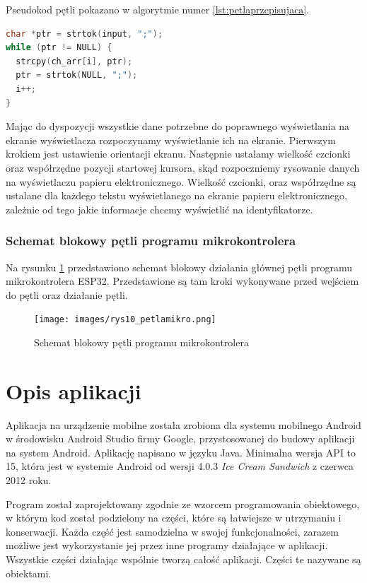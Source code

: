 \documentclass[a4paper,12pt, twoside]{article}
\begin{document}
	Pseudokod pętli pokazano w algorytmie numer \ref{lst:petlaprzepisujaca}.

\begin{lstlisting}[language=C++, label={lst:petlaprzepisujaca}, caption=Działanie pętli przepisującej otrzymane dane do tablicy]
char *ptr = strtok(input, ";");
while (ptr != NULL) {
  strcpy(ch_arr[i], ptr);
  ptr = strtok(NULL, ";");
  i++;
}\end{lstlisting}	
	\vspace{.5cm}
	Mając do dyspozycji wszystkie dane potrzebne do poprawnego wyświetlania na ekranie wyświetlacza rozpoczynamy wyświetlanie ich na ekranie. Pierwszym krokiem jest ustawienie orientacji ekranu. Następnie ustalamy wielkość czcionki oraz współrzędne pozycji startowej kursora, skąd rozpoczniemy rysowanie danych na wyświetlaczu papieru elektronicznego. Wielkość czcionki, oraz współrzędne są ustalane dla każdego tekstu wyświetlanego na ekranie papieru elektronicznego, zależnie od tego jakie informacje chcemy wyświetlić na identyfikatorze.
\vspace{1cm}
	\subsubsection{Schemat blokowy pętli programu mikrokontrolera}
	Na rysunku \ref{fig:petlamikrokontrolera} przedstawiono schemat blokowy działania głównej pętli programu mikrokontrolera ESP32. Przedstawione są tam kroki wykonywane przed wejściem do pętli oraz działanie pętli.
	
	\newpage
	\begin{figure}[H]
	        \centering
			\texttt{[image: images/rys10\_petlamikro.png]}
			\caption{Schemat blokowy pętli programu mikrokontrolera}
            \label{fig:petlamikrokontrolera}
	\end{figure}
	
	\newpage
	\section{Opis aplikacji}
	\vspace{.5cm}
	Aplikacja na urządzenie mobilne została zrobiona dla systemu mobilnego Android w środowisku Android Studio firmy Google, przystosowanej do budowy aplikacji na system Android. Aplikację napisano w języku Java. Minimalna wersja API to 15, która jest w systemie Android od wersji 4.0.3 \textit{Ice Cream Sandwich} z czerwca 2012 roku.
	
	Program został zaprojektowany zgodnie ze wzorcem programowania obiektowego\cite{oop}, w którym kod został podzielony na części, które są łatwiejsze w utrzymaniu i konserwacji. Każda część jest samodzielna w swojej funkcjonalności, zarazem możliwe jest wykorzystanie jej przez inne programy działające w aplikacji. Wszystkie części działając wspólnie tworzą całość aplikacji. Części te nazywane są obiektami. 
	
\end{document}
